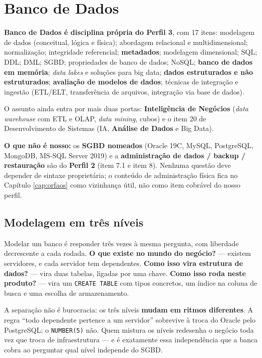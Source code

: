 \chapter{Banco de Dados}
\label{cap:banco-dados}

\begin{edital}
\textbf{Banco de Dados é disciplina própria do Perfil 3}, com 17 itens:
modelagem de dados (conceitual, lógica e física); abordagem relacional e
multidimensional; normalização; integridade referencial; \textbf{metadados};
modelagem dimensional; SQL; DDL; DML; SGBD; propriedades de banco de dados;
NoSQL; \textbf{banco de dados em memória}; \emph{data lakes} e soluções para
big data; \textbf{dados estruturados e não estruturados}; \textbf{avaliação de
modelos de dados}; técnicas de integração e ingestão (ETL/ELT, transferência
de arquivos, integração via base de dados).

O assunto ainda entra por mais duas portas: \textbf{Inteligência de Negócios}
(\emph{data warehouse} com ETL e OLAP, \emph{data mining}, cubos) e o item 20
de Desenvolvimento de Sistemas (IA, \textbf{Análise de Dados} e Big Data).

\textbf{O que não é nosso:} os \textbf{SGBD nomeados} (Oracle 19C, MySQL,
PostgreSQL, MongoDB, MS-SQL Server 2019) e a \textbf{administração de dados /
backup / restauração} são do \textbf{Perfil 2} (item 7.1 e item 8). Nenhuma
questão deve depender de sintaxe proprietária; o conteúdo de administração
física fica no Capítulo \ref{cap:orfaos} como vizinhança útil, não como item
cobrável do nosso perfil.
\end{edital}

\section{Modelagem em três níveis}

Modelar um banco é responder três vezes à mesma pergunta, com liberdade
decrescente a cada rodada. \textbf{O que existe no mundo do negócio?} ---
existem servidores, e cada servidor tem dependentes. \textbf{Como isso vira
estrutura de dados?} --- vira duas tabelas, ligadas por uma chave. \textbf{Como
isso roda neste produto?} --- vira um \texttt{CREATE TABLE} com tipos
concretos, um índice na coluna de busca e uma escolha de armazenamento.

A separação não é burocracia: os três níveis \textbf{mudam em ritmos
diferentes}. A regra ``todo dependente pertence a um servidor'' sobrevive à
troca do Oracle pelo PostgreSQL; o \texttt{NUMBER(5)} não. Quem mistura os
níveis redesenha o negócio toda vez que troca de infraestrutura --- e é
exatamente essa independência que a banca cobra ao perguntar qual nível
independe do SGBD.

